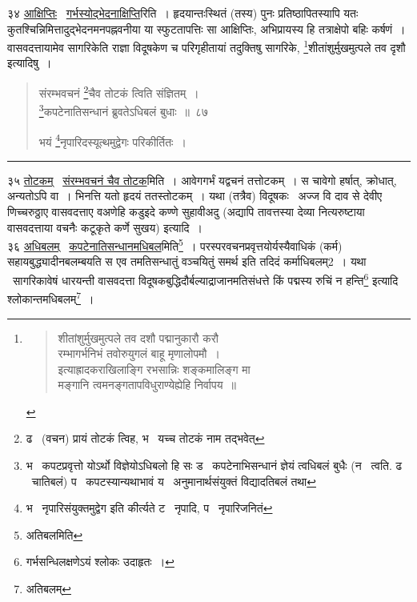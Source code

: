 \documentclass[11pt, openany]{book}
\begin{document}
३४ \underline{आक्षिप्तिः} \textendash\ \underline{गर्भस्योद्भेदनाक्षिप्ति}रिति~। हृदयान्तःस्थितं (तस्य) पुनः प्रतिष्ठापितस्यापि यतः कुतश्चिन्निमित्तादुद्भेदनमनपह्नवनीया या स्फुटतापत्तिः सा आक्षिप्तिः, अभिप्रायस्य हि तत्राक्षेपो बहिः कर्षणं~। वासवदत्तायामेव सागरिकेति राज्ञा विदूषकेण च परिगृहीतायां तदुक्तिषु {\qt सागरिके, \renewcommand{\thefootnote}{*}\footnote{\begin{quote}
{\qt शीतांशुर्मुखमुत्पले तव दशौ पद्मानुकारौ करौ\\
रम्भागर्भनिभं तवोरुयुगलं बाहू मृणालोपमौ~।\\
इत्याह्रादकराखिलाङ्गि रभसान्निः शङ्कमालिङ्ग मा\textendash \\
मङ्गानि त्वमनङ्गतापविधुराण्येह्येहि निर्वापय~॥}
\end{quote}}शीतांशुर्मुखमुत्पले तव दृशौ} इत्यादिषु~।

\newpage

\begin{quote}
{\na संरम्भवचनं \renewcommand{\thefootnote}{1}\footnote{ढ \textendash\ (वचन) प्रायं तोटकं त्विह, भ \textendash\ यच्च तोटकं नाम तद्भवेत्}चैव तोटकं त्विति संज्ञितम्~।\\
\renewcommand{\thefootnote}{2}\footnote{भ \textendash\ कपटप्रवृत्तो योऽर्थो विज्ञेयोऽधिबलो हि सः ड \textendash\ कपटेनाभिसन्धानं ज्ञेयं त्वधिबलं बुधैः (न \textendash\ त्वति. ढ \textendash\ चातिबलं) प \textendash\ कपटस्यान्यथाभावं य \textendash\ अनुमानार्थसंयुक्तं विद्यादतिबलं तथा}कपटेनातिसन्धानं ब्रुवतेऽधिबलं बुधाः~॥~८७

भयं \renewcommand{\thefootnote}{3}\footnote{भ \textendash\ नृपारिसंयुक्तमुद्वेग इति कीर्त्यते ट \textendash\ नृपादि, प \textendash\ नृपारिजनितं}नृपारिदस्यूत्थमुद्वेगः परिकीर्तितः~।}
\end{quote}

\hrule

\vspace{2mm}
३५ \underline{तोटकम्} \textendash\ \underline{संरम्भवचनं चैव तोटक}मिति~। आवेगगर्भं यद्वचनं तत्तोटकम्~। स चावेगो हर्षात्, क्रोधात्, अन्यतोऽपि वा~। भिनत्ति यतो हृदयं ततस्तोटकम्~। यथा (तत्रैव) विदूषकः \textendash\ अज्ज वि दाव से देवीए णिच्चरुठ्ठाए वासवदत्ताए वअणेहि कडुइदे कण्णे सुहावीअदु (अद्यापि तावत्तस्या देव्या नित्यरुष्टाया वासवदत्ताया वचनैः कटूकृते कर्णे सुखय) इत्यादि~।\\

३६ \underline{अधिबलम्} \textendash\ \underline{कपटेनातिसन्धानमधिबल}मिति\renewcommand{\thefootnote}{1}\footnote{अतिबलमिति}~। परस्परवचनप्रवृत्तयोर्यस्यैवाधिकं (कर्म) सहायबुद्ध्यादीनबलम्बयति स एव तमतिसन्धातुं वञ्चयितुं समर्थ इति तदिदं कर्माधिबलम्2~। यथा \textendash\ सागरिकावेषं धारयन्ती वासवदत्ता विदूषकबुद्धिदौर्बल्याद्राजानमतिसंधत्ते {\qt किं पद्मस्य रुचिं न हन्ति}\renewcommand{\thefootnote}{$\dagger$}\footnote{गर्भसन्धिलक्षणेऽयं श्लोकः उदाहृतः~।} इत्यादि श्लोकान्तमधिबलम्\renewcommand{\thefootnote}{2}\footnote{अतिबलम्}~।\\
\end{document}
